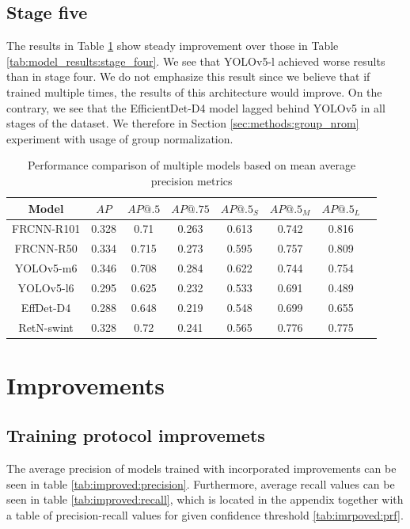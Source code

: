 \subsection{Stage five}
The results in Table \ref{tab:model_results:stage_five} show steady improvement over those in Table \ref{tab:model_results:stage_four}. We see that YOLOv5-l achieved worse results than in stage four. We do not emphasize this result since we believe that if trained multiple times, the results of this architecture would improve. On the contrary, we see that the EfficientDet-D4 model lagged behind YOLOv5 in all stages of the dataset. We therefore in Section \ref{sec:methods:group_nrom} experiment with usage of group normalization.
\begin{table}[H]
    \begin{tabular}{|c|c|c|c|c|c|c|c|}
        \hline
        Model      & $AP$  & $AP@.5$ & $AP@.75$ & $AP@.5_S$ & $AP@.5_M$ & $AP@.5_L$ \\ \hline
        FRCNN-R101 & 0.328 & 0.71    & 0.263    & 0.613     & 0.742     & 0.816     \\ \hline
        FRCNN-R50  & 0.334 & 0.715   & 0.273    & 0.595     & 0.757     & 0.809     \\ \hline
        YOLOv5-m6  & 0.346 & 0.708   & 0.284    & 0.622     & 0.744     & 0.754     \\ \hline
        YOLOv5-l6  & 0.295 & 0.625   & 0.232    & 0.533     & 0.691     & 0.489     \\ \hline
        EffDet-D4  & 0.288 & 0.648   & 0.219    & 0.548     & 0.699     & 0.655     \\ \hline
        RetN-swint & 0.328 & 0.72    & 0.241    & 0.565     & 0.776     & 0.775     \\ \hline
    \end{tabular}
    \caption{Performance comparison of multiple models based on mean average precision metrics}
    \label{tab:model_results:stage_five}
\end{table}

\section{Improvements}
\label{sec:model_improvements_results}
\subsection{Training protocol improvemets}
The average precision of models trained with incorporated improvements can be seen in table \ref{tab:improved:precision}. Furthermore, average recall values can be seen in table \ref{tab:improved:recall}, which is located in the appendix together with a table of precision-recall values for given confidence threshold \ref{tab:imrpoved:prf}.

